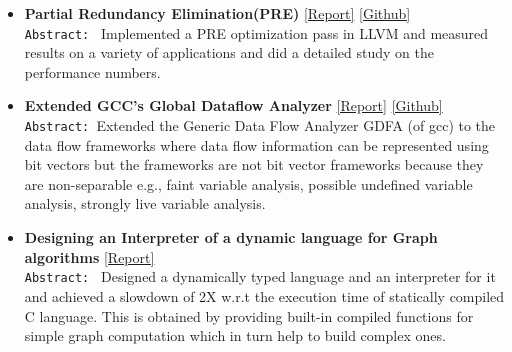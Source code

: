 \documentclass[9pt]{article}
\newenvironment{changemargin}[2]{%
  \begin{list}{}{%
    \setlength{\topsep}{0pt}%
    \setlength{\leftmargin}{#1}%
    \setlength{\rightmargin}{#2}%
    \setlength{\listparindent}{\parindent}%
    \setlength{\itemindent}{\parindent}%
    \setlength{\parsep}{\parskip}%
  }%
  \item[]}{\end{list}
}
\newenvironment{body} {
	\vspace*{-16pt}
	\begin{changemargin}{-0.25in}{-0.5in}
  }	
	{\end{changemargin}
}
\begin{document}
\begin{body}
\begin{itemize}
           \item \textbf{Partial Redundancy Elimination(PRE)} 
           \href{http://webhost.engr.illinois.edu/~sdasgup3/Document/report_cs526.pdf}{[Report]} 
           \href{https://github.com/sdasgup3/partial-redundancy-elimination}{[Github]} \\
                                  \texttt{Abstract: } Implemented a PRE
                                  optimization pass in LLVM and measured results
                                  on a variety of applications and did a detailed 
                                  study on the performance numbers. 

            \item \textbf{Extended GCC's Global Dataflow Analyzer} 
           \href{http://webhost.engr.illinois.edu/~sdasgup3/Document/report_gdfa.pdf}{[Report]} 
           \href{https://github.com/sdasgup3/non-separable-global-dataflow-framework}{[Github]} \\
                                \texttt{Abstract: }Extended the Generic Data Flow Analyzer
                                GDFA (of gcc) to the data flow frameworks where
                                data flow information can be represented using
                                bit vectors but the frameworks are not bit
                                vector frameworks because they are
                                non-separable e.g., faint variable analysis,
                                possible undefined variable analysis, strongly
                                live variable analysis.	

           \item \textbf{Designing an Interpreter of a dynamic language for Graph
algorithms}
           \href{http://webhost.engr.illinois.edu/~sdasgup3/Document/report_cs598dhp.pdf}{[Report]} \\
                                  \texttt{Abstract: } 
                                  Designed a dynamically typed language and an interpreter for it and 
                                  achieved a slowdown of 2X w.r.t the execution time of statically compiled C
                                  language. This is obtained by providing built-in compiled functions 
                                  for simple graph computation which in turn help to build complex
                                  ones.


\end{itemize}
\end{body}
\end{document}
